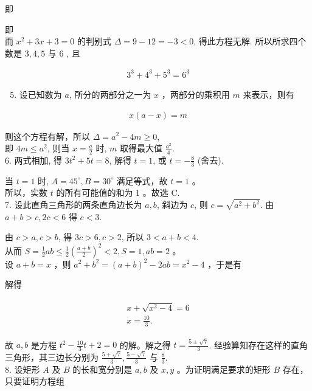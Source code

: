 \documentclass[10pt]{article}
\begin{document}
即

即\\
而 $x^{2}+3 x+3=0$ 的判别式 $\Delta=9-12=-3<0$, 得此方程无解. 所以所求四个数是 $3,4,5$ 与 6 , 且

\begin{align*}
3^{3}+4^{3}+5^{3}=6^{3}
\end{align*}

\begin{enumerate}
  \setcounter{enumi}{4}
  \item 设已知数为 $a$, 所分的两部分之一为 $x$ ，两部分的乘积用 $m$ 来表示，则有
\end{enumerate}

\begin{align*}
x(a-x)=m
\end{align*}

则这个方程有解，所以 $\Delta=a^{2}-4 m \geqslant 0$,\\
即 $4 m \leqslant a^{2}$, 则当 $x=\frac{a}{2}$ 时, $m$ 取得最大值 $\frac{a^{2}}{4}$.\\
6. 两式相加, 得 $3 t^{2}+5 t=8$, 解得 $t=1$, 或 $t=-\frac{8}{3}$ (舍去).

当 $t=1$ 时, $A=45^{\circ}, B=30^{\circ}$ 满足等式，故 $t=1$ 。\\
所以，实数 $t$ 的所有可能值的和为 1 。故选 C.\\
7. 设此直角三角形的两条直角边长为 $a, b$, 斜边为 $c$, 则 $c=\sqrt{a^{2}+b^{2}}$. 由 $a+b>c, 2 c<6$ 得 $c<3$.

由 $c>a, c>b$, 得 $3 c>6, c>2$, 所以 $3<a+b<4$.\\
从而 $S=\frac{1}{2} a b \leqslant \frac{1}{2}\left(\frac{a+b}{2}\right)^{2}<2, S=1, a b=2$ 。\\
设 $a+b=x$ ，则 $a^{2}+b^{2}=(a+b)^{2}-2 a b=x^{2}-4$ ，于是有

解得

\begin{align*}
\begin{gathered}
x+\sqrt{x^{2}-4}=6 \\
x=\frac{10}{3} .
\end{gathered}
\end{align*}

故 $a, b$ 是方程 $t^{2}-\frac{10}{3} t+2=0$ 的解。解之得 $t=\frac{5 \pm \sqrt{7}}{3}$. 经验算知存在这样的直角三角形，其三边长分别为 $\frac{5+\sqrt{7}}{3}, \frac{5-\sqrt{7}}{3}$ 与 $\frac{8}{3}$.\\
8. 设矩形 $A$ 及 $B$ 的长和宽分别是 $a, b$ 及 $x, y$ 。为证明满足要求的矩形 $B$ 存在，只要证明方程组
\end{document}
